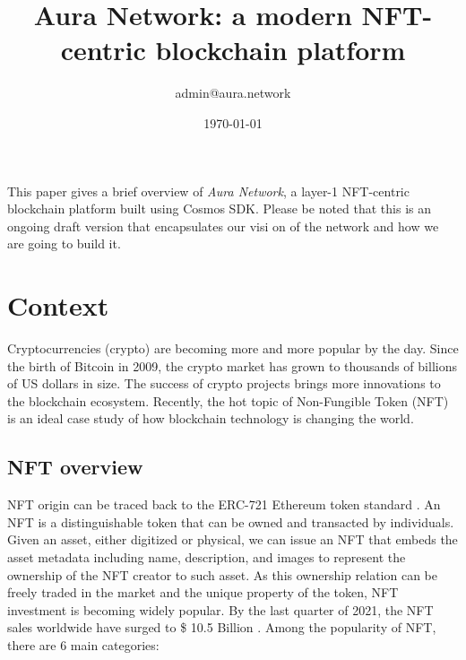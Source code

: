\documentclass[12pt]{article}
\begin{document}
\title{Aura Network: a modern NFT-centric blockchain platform}
\author{admin@aura.network}
\date{\today}
\maketitle


This paper gives a brief overview of \emph{Aura Network}, a layer-1 NFT-centric blockchain platform built using Cosmos SDK. Please be noted that this is an ongoing draft version that encapsulates our visi on of the network and how we are going to build it.

\section{Context}

Cryptocurrencies (crypto) are becoming more and more popular by the day. Since the birth of Bitcoin in 2009, the crypto market has grown to thousands of billions of US dollars in size. The success of crypto projects brings more innovations to the blockchain ecosystem. Recently, the hot topic of Non-Fungible Token (NFT) is an ideal case study of how blockchain technology is changing the world.

\subsection{NFT overview}
NFT origin can be traced back to the ERC-721 Ethereum token standard \cite{entriken2018erc}. An NFT is a distinguishable token that can be owned and transacted by individuals. 
Given an asset, either digitized or physical, we can issue an NFT that embeds the asset metadata including name, description, and images to represent the ownership of the NFT creator to such asset. As this ownership relation can be freely traded in the market and the unique property of the token, NFT investment is becoming widely popular. By the last quarter of 2021, the NFT sales worldwide have surged to \$ 10.5 Billion \cite{nftsale}. Among the popularity of NFT, there are 6 main categories:
\end{document}
